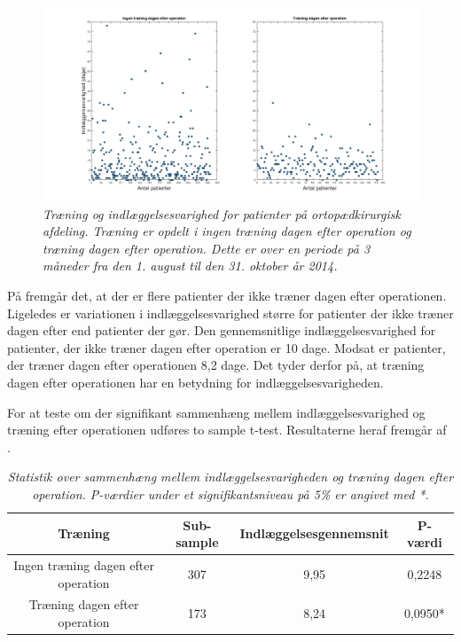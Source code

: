 \begin{figure}[H]
	\centering
	\includegraphics[scale=0.35]{figures/traeningindlaeg.png}
	\caption{\textit{Træning og indlæggelsesvarighed for patienter på ortopædkirurgisk afdeling. Træning er opdelt i ingen træning dagen efter operation og træning dagen efter operation. Dette er over en periode på 3 måneder fra den 1. august til den 31. oktober år 2014.}}
	\label{traeningindlaeg}
	\end{figure}

\noindent
På  fremgår det, at der er flere patienter der ikke træner dagen efter operationen. Ligeledes er variationen i indlæggelsesvarighed større for patienter der ikke træner dagen efter end patienter der gør. Den gennemsnitlige indlæggelsesvarighed for patienter, der ikke træner dagen efter operation er 10 dage. Modsat er patienter, der træner dagen efter operationen 8,2 dage. Det tyder derfor på, at træning dagen efter operationen har en betydning for indlæggelsesvarigheden. 

For at teste om der signifikant sammenhæng mellem indlæggelsesvarighed og træning efter operationen udføres to sample t-test. Resultaterne heraf fremgår af . 

\begin{table}[H]
\centering
\begin{tabular}{|c|c|c|c|}
\hline
\textbf{Træning}    & \textbf{Sub-sample} & \textbf{Indlæggelsesgennemsnit} & \textbf{P-værdi} \\ \hline
Ingen træning dagen efter operation      & 307                 & 9,95                            & 0,2248           \\ \hline
Træning dagen efter operation & 173                 & 8,24                            & 0,0950*          \\ \hline
\end{tabular}
\caption{\textit{Statistik over sammenhæng mellem indlæggelsesvarigheden og træning dagen efter operation. P-værdier under et signifikantsniveau på 5\% er angivet med *.}}
\label{traeningindlaegtab}
\end{table}

